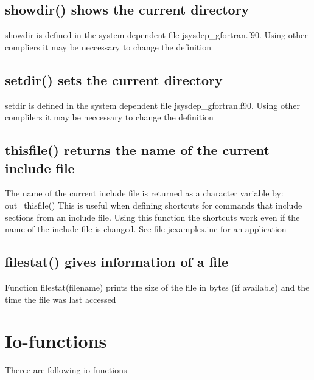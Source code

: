 \subsection{\textcolor{VioletRed}{showdir}() shows the current directory}
\label{showdir}
\begin{note}
showdir is defined in the system dependent file jsysdep\_gfortran.f90.
Using other compliers it may be neccessary to change the definition
\end{note}
\subsection{\textcolor{VioletRed}{setdir}() sets the current directory}
\label{setdir}
\begin{note}
setdir is defined in the system dependent file jsysdep\_gfortran.f90.
Using other complilers it may be neccessary to change the definition
\end{note}
\subsection{\textcolor{VioletRed}{thisfile}() returns the name of the current include file}
\label{thisfile}
The name of the current include file is returned as a character variable by:
out=\textcolor{VioletRed}{thisfile}()
This is useful when defining shortcuts for commands that include sections from an include file.
Using this function the shortcuts work even if the name of the include file is changed. See file
jexamples.inc for an application
\subsection{\textcolor{VioletRed}{filestat}() gives information of a file}
\label{filestat}
Function \textcolor{VioletRed}{filestat}(filename) prints the size of the
file in bytes (if available) and the time the file was last accessed
\section{Io-functions}
\label{io}
Theree are following io functions
